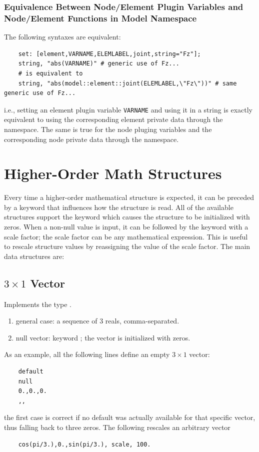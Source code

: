\subsubsection{Equivalence Between Node/Element Plugin Variables and Node/Element Functions in Model Namespace}
The following syntaxes are equivalent:
\begin{verbatim}
    set: [element,VARNAME,ELEMLABEL,joint,string="Fz"];
    string, "abs(VARNAME)" # generic use of Fz...
    # is equivalent to
    string, "abs(model::element::joint(ELEMLABEL,\"Fz\"))" # same generic use of Fz...
\end{verbatim}
i.e., setting an element plugin variable \texttt{VARNAME} and using it in a string is exactly equivalent to using the corresponding element private data through the  namespace.
The same is true for the node pluging variables and the corresponding node private data through the  namespace.



\section{Higher-Order Math Structures}
Every time a higher-order mathematical structure is expected, it can be
preceded by a keyword that influences how the structure is read.
All of the available structures support the keyword 
which causes the structure to be initialized with zeros.
When a non-null value is input, it can be followed by the keyword
 with a scale factor; the scale factor can be any
mathematical expression.
This is useful to rescale structure values by reassigning the value 
of the scale factor.
The main data structures are:
\subsection{$3 \times 1$ Vector}
\label{sec:Vec3}
Implements the type .
\begin{enumerate}
    \item general case: a sequence of 3 reals, comma-separated.
    \item null vector: keyword ; the vector is initialized
	with zeros.
\end{enumerate}
As an example, all the following lines define an empty $3 \times 1$ vector:
\begin{verbatim}
    default
    null
    0.,0.,0.
    ,,
\end{verbatim}
the first case is correct if no default was actually available
for that specific vector, thus falling back to three zeros.
The following rescales an arbitrary vector
\begin{verbatim}
    cos(pi/3.),0.,sin(pi/3.), scale, 100.
\end{verbatim}

